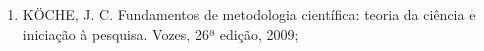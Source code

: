 \begin{itemize}
\begin{enumerate}
    \item KÖCHE, J. C. Fundamentos de metodologia científica: teoria da ciência e iniciação à pesquisa. Vozes, 26ª edição, 2009;










	\end{enumerate}

\end{itemize}
